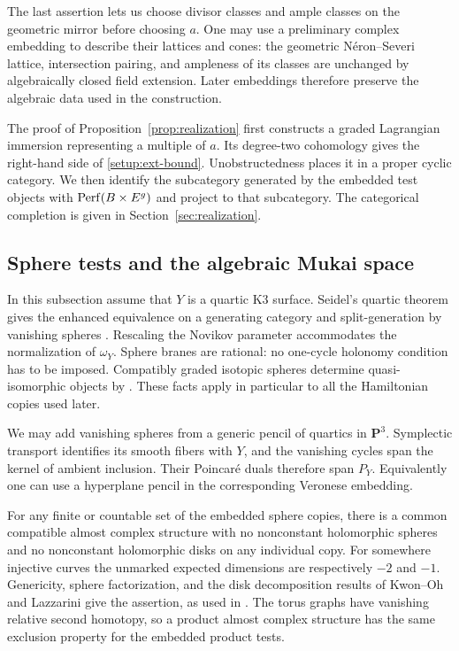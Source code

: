 The last assertion lets us choose divisor classes and ample classes on
the geometric mirror before choosing $a$.  One may use a preliminary
complex embedding to describe their lattices and cones: the geometric
N\'eron--Severi lattice, intersection pairing, and ampleness of its
classes are unchanged by algebraically closed field extension.  Later
embeddings therefore preserve the algebraic data used in the
construction.

The proof of Proposition~\ref{prop:realization} first constructs a graded
Lagrangian immersion representing a multiple of $a$.  Its degree-two
cohomology gives the right-hand side of \eqref{setup:ext-bound}.
Unobstructedness places it in a proper cyclic category.  We then identify
the subcategory generated by the embedded test objects with
$\operatorname{Perf}(B\times E^g)$ and project to that subcategory.  The categorical
completion is given in Section~\ref{sec:realization}.

\subsection{Sphere tests and the algebraic Mukai space}

In this subsection assume that $Y$ is a quartic K3 surface.
Seidel's quartic theorem gives the enhanced equivalence on a generating
category and split-generation by vanishing spheres
\cite[Theorem~1.3, Corollary~9.6, and Lemma~11.4]{SeidelQuartic}.
Rescaling the Novikov parameter accommodates the normalization of
$\omega_Y$.  Sphere branes are rational: no one-cycle holonomy condition
has to be imposed.  Compatibly graded isotopic spheres determine
quasi-isomorphic objects by \cite[Lemma~8.14]{SeidelQuartic}.  These facts
apply in particular to all the Hamiltonian copies used later.

We may add vanishing spheres from a generic pencil of quartics in
$\mathbf P^3$.  Symplectic transport identifies its smooth fibers with
$Y$, and the vanishing cycles span the kernel of ambient inclusion.
Their Poincar\'e duals therefore span $P_Y$.  Equivalently one can use
a hyperplane pencil in the corresponding Veronese embedding.

For any finite or countable set of the embedded sphere copies, there is
a common compatible almost complex structure with no nonconstant
holomorphic spheres and no nonconstant holomorphic disks on any
individual copy.  For somewhere injective curves the unmarked expected
dimensions are respectively $-2$ and $-1$.  Genericity, sphere
factorization, and the disk decomposition results of Kwon--Oh and
Lazzarini \cite{KwonOh,Lazzarini} give the assertion, as used in
\cite[Section~8]{SeidelQuartic}.  The torus graphs have vanishing relative
second homotopy, so a product almost complex structure has the same
exclusion property for the embedded product tests.

